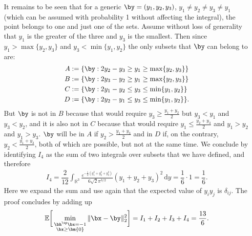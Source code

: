 \documentclass[11pt]{article}
\numberwithin{equation}{section}
\numberwithin{figure}{section}
\begin{document}
It remains to be seen that for a generic $\by = (y_1, y_2, y_3)$, $y_1 \neq y_2 \neq y_3 \neq y_1$ (which can be assumed with probability 1 without affecting the integral), the point belongs to one and just one of the sets. Assume without loss of generality that $y_1$ is the greater of the three and $y_3$ is the smallest. Then since $y_1 > \max\{y_2, y_3\}$ and $y_3 < \min\{y_1, y_2\}$ the only subsets that $\by$ can belong to are: 
\begin{align*}
A &:= \{ \by: 2y_2-y_3 \geq y_1 \geq \max\{y_2, y_3\} \}\\
B &:=\{ \by: 2y_3-y_2 \geq y_1 \geq \max\{y_2, y_3\} \}\\
C &:=\{ \by: 2y_1-y_2 \leq y_3 \leq \min\{y_1, y_2\} \}\\
D &:=\{ \by: 2y_2-y_1 \leq y_3 \leq \min\{y_1, y_2\} \}.
\end{align*}
But $\by$ is not in $B$ because that would require $y_3 \geq \frac{y_1 + y_2}{2}$ but $y_3 < y_1$ and $y_3 < y_2$, and it is also not in $C$ because that would require $y_1 \leq \frac{y_2+y_3}{2}$ and $y_1 > y_2$ and $y_1 > y_3$. $\by$ will be in $A$ if $y_2 > \frac{y_1+y_3}{2}$ and in $D$ if, on the contrary, $y_2 < \frac{y_1+y_3}{2}$, both of which are possible, but not at the same time. We conclude by identifying $I_4$ as the sum of two integrals over subsets that we have defined, and therefore
\begin{align*}
        I_4 = \dfrac{2}{12} \int_{\mathbb R^3}  \frac{e^{-\frac{1}{2}(y_1^2 + y_2^2 +y_3^2)}}{6 \sqrt{2} \pi ^{3/2}} (y_1 + y_2 + y_3)^2 \, \mathrm{d}y = \dfrac 1 6 \cdot 1 = \dfrac 1 6.
\end{align*}
Here we expand the sum and use again  that the expected value of $y_iy_j$ is $\delta_{ij}$. The proof concludes by adding up
\[
    \mathbb E \bigg [\min_{\substack{\bh^\tp \bx = -1 \\ \bx \geq \bm{0}}}\Vert \bx -\by \Vert^2_2 \bigg] =I_1 + I_2 + I_3 + I_4 = \frac {13}{6}.
\]
\end{document}
